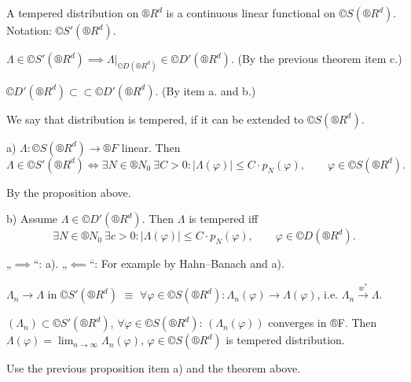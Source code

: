 \documentclass[12pt]{article}					%
\begin{document}
\begin{definice}
	A tempered distribution on $®R^d$ is a continuous linear functional on $©S(®R^d)$. Notation: $©S'(®R^d)$.
\end{definice}

\begin{poznamka}
	$Λ \in ©S'(®R^d) \implies Λ|_{©D(®R^d)} \in ©D'(®R^d)$. (By the previous theorem item c.)

	$©D'(®R^d) \subset \subset ©D'(®R^d)$. (By item a. and b.)

	We say that distribution is tempered, if it can be extended to $©S(®R^d)$.
\end{poznamka}

\begin{tvrzeni}
	a) $Λ: ©S(®R^d) \rightarrow ®F$ linear. Then
	$$ Λ \in ©S'(®R^d) \Leftrightarrow \exists N \in ®N_0\ \exists C > 0: |Λ(φ)| ≤ C·p_N(φ), \qquad φ \in ©S(®R^d). $$

	\begin{dukazin}
		By the proposition above.
	\end{dukazin}

	b) Assume $Λ \in ©D'(®R^d)$. Then $Λ$ is tempered iff
	$$ \exists N \in ®N_0\ \exists c > 0: |Λ(φ)| ≤ C·p_N(φ), \qquad φ \in ©D(®R^d). $$

	\begin{dukazin}
		„$\implies$“: a). „$\impliedby$“: For example by Hahn–Banach and a).
	\end{dukazin}
\end{tvrzeni}

\begin{definice}[Convergence in $©S'$]
	$Λ_n \rightarrow Λ$ in $©S'(®R^d)$ $≡$ $\forall φ \in ©S(®R^d): Λ_n(φ) \rightarrow Λ(φ)$, i.e. $Λ_n \overset{w^*}\rightarrow Λ$.
\end{definice}

\begin{veta}
	$(Λ_n) \subset ©S'(®R^d)$, $\forall φ \in ©S(®R^d)$: $(Λ_n(φ))$ converges in ®F. Then $Λ(φ) = \lim_{n \rightarrow ∞} Λ_n(φ)$, $φ \in ©S(®R^d)$ is tempered distribution.
	
	\begin{dukazin}
		Use the previous proposition item a) and the theorem above.
	\end{dukazin}
\end{veta}
\end{document}
